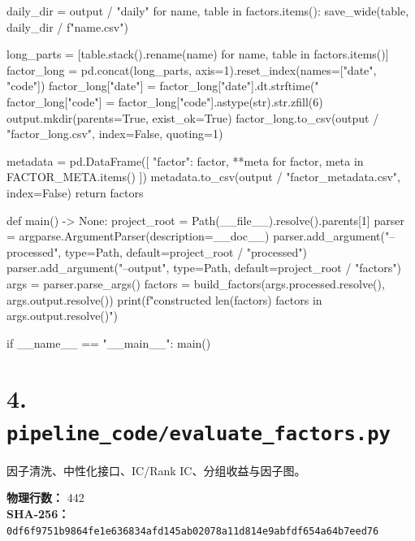 \documentclass[UTF8,a4paper,fontset=fandol]{ctexart}
\begin{document}
\begin{ProjectCode}
    daily_dir = output / "daily"
    for name, table in factors.items():
        save_wide(table, daily_dir / f"{name}.csv")

    long_parts = [table.stack().rename(name)
                  for name, table in factors.items()]
    factor_long = pd.concat(long_parts, axis=1).reset_index(names=["date", "code"])
    factor_long["date"] = factor_long["date"].dt.strftime("%
    factor_long["code"] = factor_long["code"].astype(str).str.zfill(6)
    output.mkdir(parents=True, exist_ok=True)
    factor_long.to_csv(output / "factor_long.csv", index=False, quoting=1)

    metadata = pd.DataFrame([
        {"factor": factor, **meta} for factor, meta in FACTOR_META.items()
    ])
    metadata.to_csv(output / "factor_metadata.csv", index=False)
    return factors


def main() -> None:
    project_root = Path(__file__).resolve().parents[1]
    parser = argparse.ArgumentParser(description=__doc__)
    parser.add_argument("--processed", type=Path, default=project_root / "processed")
    parser.add_argument("--output", type=Path, default=project_root / "factors")
    args = parser.parse_args()
    factors = build_factors(args.processed.resolve(), args.output.resolve())
    print(f"constructed {len(factors)} factors in {args.output.resolve()}")


if __name__ == "__main__":
    main()
\end{ProjectCode}
\clearpage
\section{4. \texttt{pipeline\_code/evaluate\_factors.py}}
因子清洗、中性化接口、IC/Rank IC、分组收益与因子图。

\textbf{物理行数：} 442\\
\textbf{SHA-256：} \texttt{0df6f9751b9864fe1e636834afd145ab02078a11d814e9abfdf654a64b7eed76}
\end{document}
